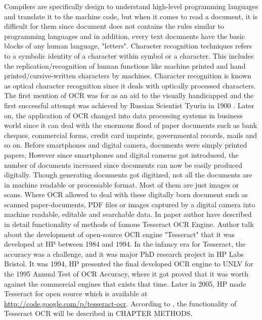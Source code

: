 Compilers are specifically design to understand high-level programming languages and translate it to the machine code, but when it comes to read a document, it is difficult for them since document does not contains the rules similar to programming languages and in addition, every text documents have the basic blocks of any human language, "letters". Character recognition techniques refers to a symbolic identity of a character within symbol or a character. This includes the replication/recognition of human functions like machine printed and hand printed/cursive-written characters by machines. Character recognition is known as optical character recognition since it deals with optically processed characters. The first mention of OCR was for as an aid to the visually handicapped and the first successful attempt was achieved by Russian Scientist Tyurin in 1900 \cite{govindan1990character}. Later on, the application of OCR changed into data processing systems in business world since it can deal with the enormous flood of paper documents such as bank cheques, commercial forms, credit card imprints, governmental records, mails and so on. Before smartphones and digital camera, documents were simply printed papers, However since smartphones and digital cameras got introduced, the number of documents increased since documents can now be easily produced digitally. Though generating documents got digitized, not all the documents are in machine readable or processable format. Most of them are just images or scans. Where OCR allowed to deal with these digitally born document such as scanned paper-documents, PDF files or images captured by a digital camera into machine readable, editable and searchable data. In paper \citep{AnOverviewoftheTesseractOCREngine} author have described in detail functionality of methods of famous Tesseract OCR Engine. Author talk about the development of open-source OCR engine "Tesseract" that it was developed at HP between 1984 and 1994. In the infancy era for Tesseract, the accuracy was a challenge, and it was major PhD research project in HP Labs Bristol. It was 1994, HP presented the final developed OCR engine to UNLV for the 1995 Annual Test of OCR Accuracy\cite{UNLV_4th_annual_test_ocr}, where it got proved that it was worth against the commercial engines that exists that time. Later in 2005, HP made Tesseract for open source which is available at \url{http://code.google.com/p/tesseract-ocr}. According to \cite{AnOverviewoftheTesseractOCREngine}, the functionality of Tesseract OCR will be described in CHAPTER METHODS.



